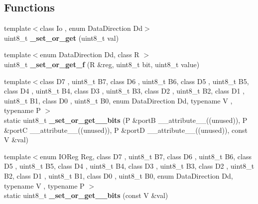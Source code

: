 \subsection*{Functions}
\begin{DoxyCompactItemize}
\item 
{\footnotesize template$<$class Io , enum Data\+Direction Dd$>$ }\\uint8\+\_\+t {\bfseries \+\_\+set\+\_\+or\+\_\+get} (uint8\+\_\+t val)\hypertarget{namespace__ports_a781d3f5383608f336f740e714c2cc758}{}\label{namespace__ports_a781d3f5383608f336f740e714c2cc758}

\item 
{\footnotesize template$<$enum Data\+Direction Dd, class R $>$ }\\uint8\+\_\+t {\bfseries \+\_\+set\+\_\+or\+\_\+get\+\_\+f} (R \&reg, uint8\+\_\+t bit, uint8\+\_\+t value)\hypertarget{namespace__ports_a2e35face5e603bbecee1769438712116}{}\label{namespace__ports_a2e35face5e603bbecee1769438712116}

\item 
{\footnotesize template$<$class D7 , uint8\+\_\+t B7, class D6 , uint8\+\_\+t B6, class D5 , uint8\+\_\+t B5, class D4 , uint8\+\_\+t B4, class D3 , uint8\+\_\+t B3, class D2 , uint8\+\_\+t B2, class D1 , uint8\+\_\+t B1, class D0 , uint8\+\_\+t B0, enum Data\+Direction Dd, typename V , typename P $>$ }\\static uint8\+\_\+t {\bfseries \+\_\+set\+\_\+or\+\_\+get\+\_\+\_\+bits} (P \&portB \+\_\+\+\_\+attribute\+\_\+\+\_\+((unused)), P \&portC \+\_\+\+\_\+attribute\+\_\+\+\_\+((unused)), P \&portD \+\_\+\+\_\+attribute\+\_\+\+\_\+((unused)), const V \&val)\hypertarget{namespace__ports_ad68eeb9c395918e6b4b8fa3a3541000b}{}\label{namespace__ports_ad68eeb9c395918e6b4b8fa3a3541000b}

\item 
{\footnotesize template$<$enum I\+O\+Reg Reg, class D7 , uint8\+\_\+t B7, class D6 , uint8\+\_\+t B6, class D5 , uint8\+\_\+t B5, class D4 , uint8\+\_\+t B4, class D3 , uint8\+\_\+t B3, class D2 , uint8\+\_\+t B2, class D1 , uint8\+\_\+t B1, class D0 , uint8\+\_\+t B0, enum Data\+Direction Dd, typename V , typename P $>$ }\\static uint8\+\_\+t {\bfseries \+\_\+set\+\_\+or\+\_\+get\+\_\+\_\+bits} (const V \&val)\hypertarget{namespace__ports_a5cfab313489ac3e5c3a7370a853410e4}{}\label{namespace__ports_a5cfab313489ac3e5c3a7370a853410e4}

\end{DoxyCompactItemize}


